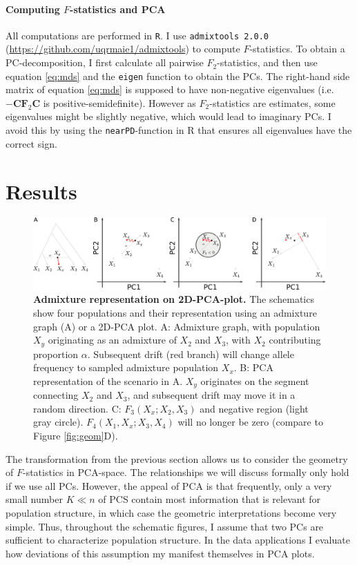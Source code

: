 \documentclass[12pt,fullpage, a4paper]{article}
\newcommand{\MC}{\mathbf{C}} %
\newcommand{\MF}{\mathbf{F}_2} %
\begin{document}
\paragraph{Computing $F$-statistics and PCA}
All computations are performed in \texttt{R}. I use \texttt{admixtools 2.0.0} (\url{https://github.com/uqrmaie1/admixtools}) to compute $F$-statistics. To obtain a PC-decomposition, I first calculate all pairwise $F_2$-statistics, and then use equation \ref{eq:mds} and the \texttt{eigen} function to obtain the PCs. The right-hand side matrix of equation \ref{eq:mds} is supposed to have non-negative eigenvalues (i.e. $-\MC\MF\MC$ is positive-semidefinite). However as $F_2$-statistics are estimates, some eigenvalues might be slightly negative, which would lead to imaginary PCs. I avoid this by using the \texttt{nearPD}-function in R that ensures all eigenvalues have the correct sign.

\section{Results}



\begin{figure}[!ht]
	\includegraphics[width=\textwidth]{figures/fstats_admixture_pca.pdf}
	\caption{\textbf{Admixture representation on 2D-PCA-plot.} The schematics show four populations and their representation using an admixture graph (A) or a 2D-PCA plot. A: Admixture graph, with population $X_y$ originating as an admixture of $X_2$ and $X_3$, with $X_2$ contributing proportion $\alpha$. Subsequent drift (red branch) will change allele frequency to sampled admixture population $X_x$. B: PCA representation of the scenario in A. $X_y$ originates on the segment connecting $X_2$ and $X_3$, and subsequent drift may move it in a random direction. C: $F_3(X_x; X_2, X_3)$ and negative region (light gray circle). $F_4(X_1, X_x; X_3, X_4)$ will no longer be zero (compare to Figure \ref{fig:geom}D). }
	\label{fig:admix}
\end{figure}


The transformation from the previous section allows us to consider the geometry of $F$-statistics in PCA-space. The relationships we will discuss formally only hold if we use all PCs. However, the appeal of PCA is that frequently, only a very small number $K \ll n$ of PCS contain most information that is
relevant for population structure, in which case the geometric interpretations become very simple. Thus, throughout the schematic figures, I assume that two PCs are sufficient to characterize population structure. In the data applications I evaluate how deviations of this assumption my manifest themselves in PCA plots.
\end{document}
